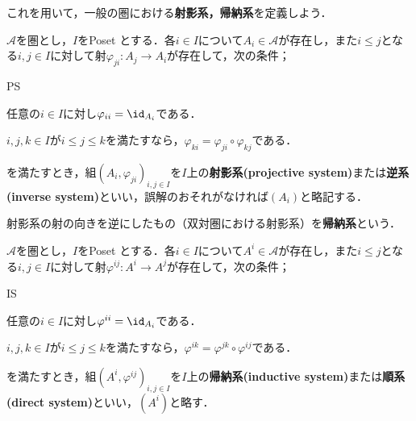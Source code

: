 
これを用いて，一般の圏における\textbf{射影系，帰納系}を定義しよう．

\begin{defi}[射影系]
	$\mathscr{A}$を圏とし，$I$をPoset とする．各$i\in I$について$A_i\in\mathscr{A}$が存在し，また$i\leq j$となる$i,j\in I$に対して射$\varphi_{ji}:A_j\to A_i$が存在して，次の条件；
	\begin{defiterm}{PS}
		\item 任意の$i\in I$に対し$\varphi_{ii}=\id_{A_i}$である．
		\item $i,j,k\in I$が$i\leq j\leq k$を満たすなら，$\varphi_{ki}=\varphi_{ji}\circ\varphi_{kj}$である．
	\end{defiterm}
	を満たすとき，組$(A_i,\varphi_{ji})_{i,j\in I}$を$I$上の\textbf{射影系(projective system)}または\textbf{逆系(inverse system)}といい，誤解のおそれがなければ$(A_i)$と略記する．
\end{defi}

射影系の射の向きを逆にしたもの（双対圏における射影系）を\textbf{帰納系}という．
\begin{defi}[帰納系]
	$\mathscr{A}$を圏とし，$I$をPoset とする．各$i\in I$について$A^i\in\mathscr{A}$が存在し，また$i\leq j$となる$i,j\in I$に対して射$\varphi^{ij}:A^i\to A^j$が存在して，次の条件；
	\begin{defiterm}{IS}
		\item 任意の$i\in I$に対し$\varphi^{ii}=\id_{A_i}$である．
		\item $i,j,k\in I$が$i\leq j\leq k$を満たすなら，$\varphi^{ik}=\varphi^{jk}\circ\varphi^{ij}$である．
	\end{defiterm}
	を満たすとき，組$(A^i,\varphi^{ij})_{i,j\in I}$を$I$上の\textbf{帰納系(inductive system)}または\textbf{順系(direct system)}といい，$(A^i)$と略す．
\end{defi}

